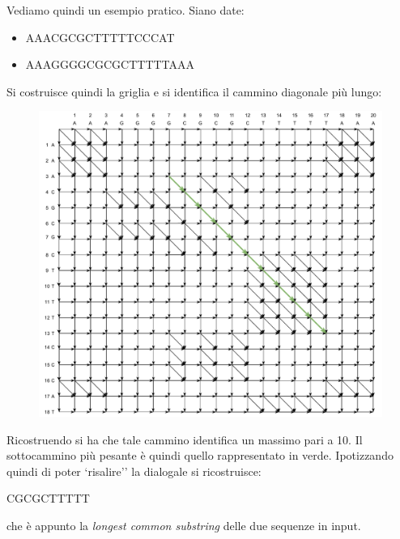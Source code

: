 \documentclass[a4paper,12pt, oneside]{book}
\begin{document}
\begin{esempio}
  Vediamo quindi un esempio pratico. Siano date:
  \begin{itemize}
    \item AAACGCGCTTTTTCCCAT
    \item AAAGGGGCGCGCTTTTTAAA
  \end{itemize}
  \newpage
  Si costruisce quindi la griglia e si identifica il cammino diagonale più
  lungo: 
  \begin{figure}[H]
    \centering
    \includegraphics[scale = 0.62]{img/es4.pdf}
  \end{figure}
  Ricostruendo si ha che tale cammino identifica un massimo pari a 10. Il
  sottocammino più pesante è quindi quello rappresentato in verde. Ipotizzando
  quindi di poter `risalire'' la dialogale si
  ricostruisce: 
  \begin{center}
    CGCGCTTTTT
  \end{center}
  che è appunto la \textit{longest common substring} delle due sequenze in
  input. 
\end{esempio}
\end{document}
